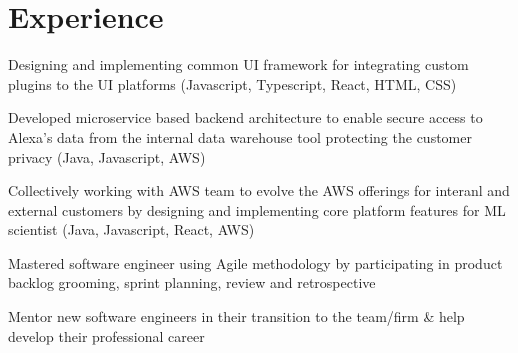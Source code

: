 \documentclass[]{main}
\begin{document}
\hfill
\begin{minipage}[t]{0.73\textwidth} 


\section{Experience}


\vspace{\topsep} %
\begin{tightemize}
\item Designing and implementing common UI framework for integrating custom plugins to the UI platforms (Javascript, Typescript, React, HTML, CSS)
\item Developed microservice based backend architecture to enable secure access to Alexa's data from the internal data warehouse tool protecting the customer privacy (Java, Javascript, AWS)
\item Collectively working with AWS team to evolve the AWS offerings for interanl and external customers by designing and implementing core platform features for ML scientist (Java, Javascript, React, AWS)
\item Mastered software engineer using Agile methodology by participating in product backlog
grooming, sprint planning, review and retrospective
\item Mentor new software engineers in their transition to the team/firm \& help develop their professional career
\end{tightemize}
\sectionsep




\end{minipage}
\end{document}
